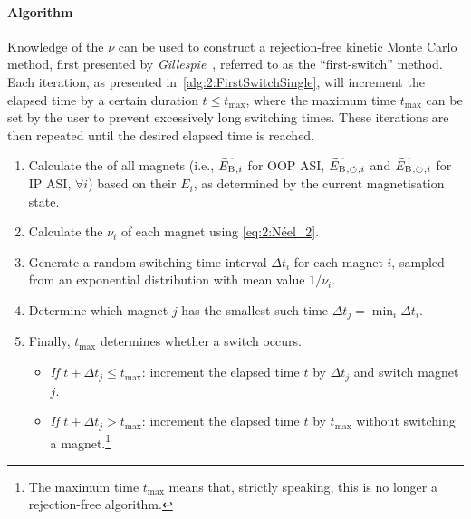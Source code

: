 \paragraph{Algorithm}
Knowledge of the  $\nu$ can be used to construct a rejection-free kinetic Monte Carlo method, first presented by \textit{Gillespie}~\cite{gillespie1976general}, referred to as the ``first-switch'' method.
Each iteration, as presented in~\cref{alg:2:FirstSwitchSingle}, will increment the elapsed time by a certain duration $t \leq t_\mathrm{max}$, where the maximum time $t_\mathrm{max}$ can be set by the user to prevent excessively long switching times.
These iterations are then repeated until the desired elapsed time is reached. \par
\begin{algorithm}
	\label{alg:2:FirstSwitchSingle}
	\begin{enumerate}[rightmargin=15pt]
		\item Calculate the  of all magnets (i.e., $\widetilde{E_\mathrm{B}}{}_{,i}$ for OOP ASI, $\widetilde{E_\mathrm{B}}{}_{,\circlearrowleft}{}_{,i}$ and $\widetilde{E_\mathrm{B}}{}_{,\circlearrowright}{}_{,i}$ for IP ASI, $\forall i$) based on their  $E_i$, as determined by the current magnetisation state.
		\item Calculate the  $\nu_i$ of each magnet using \cref{eq:2:Néel_2}.
		\item Generate a random switching time interval $\Delta t_i$ for each magnet $i$, sampled from an exponential distribution with mean value $1/\nu_i$.
		\item Determine which magnet $j$ has the smallest such time $\Delta t_j = \min_i \Delta t_i$.
		\item Finally, $t_\mathrm{max}$ determines whether a switch occurs.
		\begin{itemize}
			\item \textit{If $t + \Delta t_j \leq t_\mathrm{max}$}: increment the elapsed time $t$ by $\Delta t_j$ and switch magnet $j$.
			\item \textit{If $t + \Delta t_j > t_\mathrm{max}$}: increment the elapsed time $t$ by $t_\mathrm{max}$ without switching a magnet.\footnote{The maximum time $t_\mathrm{max}$ means that, strictly speaking, this is no longer a rejection-free algorithm.}
		\end{itemize}
	\end{enumerate} %
\end{algorithm}
